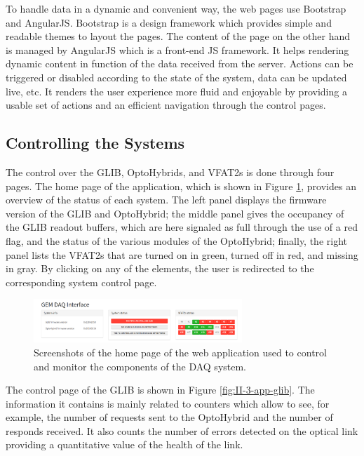       To handle data in a dynamic and convenient way, the web pages use Bootstrap and AngularJS. Bootstrap is a design framework which provides simple and readable themes to layout the pages. The content of the page on the other hand is managed by AngularJS which is a front-end JS framework. It helps rendering dynamic content in function of the data received from the server. Actions can be triggered or disabled according to the state of the system, data can be updated live, etc. It renders the user experience more fluid and enjoyable by providing a usable set of actions and an efficient navigation through the control pages.

    \subsection{Controlling the Systems}

      The control over the GLIB, OptoHybrids, and VFAT2s is done through four pages. The home page of the application, which is shown in Figure \ref{fig:II-3-app-home}, provides an overview of the status of each system. The left panel displays the firmware version of the GLIB and OptoHybrid; the middle panel gives the occupancy of the GLIB readout buffers, which are here signaled as full through the use of a red flag, and the status of the various modules of the OptoHybrid; finally, the right panel lists the VFAT2s that are turned on in green, turned off in red, and missing in gray. By clicking on any of the elements, the user is redirected to the corresponding system control page. \\

      \begin{figure}[h!]
        \centering
        \includegraphics[width=0.7\textwidth]{img/II-3-test-beam/app-home.png}
        \caption{Screenshots of the home page of the web application used to control and monitor the components of the DAQ system.}
        \label{fig:II-3-app-home}
      \end{figure}

      The control page of the GLIB is shown in Figure \ref{fig:II-3-app-glib}. The information it contains is mainly related to counters which allow to see, for example, the number of requests sent to the OptoHybrid and the number of responds received. It also counts the number of errors detected on the optical link providing a quantitative value of the health of the link. \\

